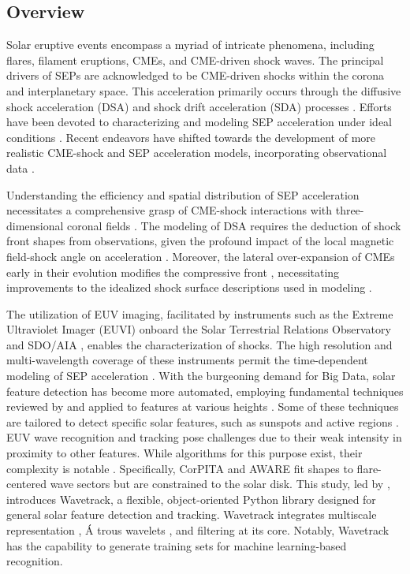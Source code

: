 \subsection{Overview}
Solar eruptive events encompass a myriad of intricate phenomena, including flares, filament eruptions, CMEs, and CME-driven shock waves. The principal drivers of SEPs are acknowledged to be CME-driven shocks within the corona and interplanetary space. This acceleration primarily occurs through the diffusive shock acceleration (DSA) and shock drift acceleration (SDA) processes \citep{reames_2021}. Efforts have been devoted to characterizing and modeling SEP acceleration under ideal conditions \citep{vainio_2008, sokolov_2009, kozarev_2013}. Recent endeavors have shifted towards the development of more realistic CME-shock and SEP acceleration models, incorporating observational data \citep{vourlidas_2012, kwon_2014, kozarev_2015, kozarev_2019}.

Understanding the efficiency and spatial distribution of SEP acceleration necessitates a comprehensive grasp of CME-shock interactions with three-dimensional coronal fields \cite{rouillard_2016}. The modeling of DSA requires the deduction of shock front shapes from observations, given the profound impact of the local magnetic field-shock angle on acceleration \cite{guo_2013}. Moreover, the lateral over-expansion of CMEs early in their evolution modifies the compressive front \cite{bein_2011, temmer_2016}, necessitating improvements to the idealized shock surface descriptions used in modeling \citep{vourlidas_2012, kwon_2014, rouillard_2016}.

The utilization of EUV imaging, facilitated by instruments such as the Extreme Ultraviolet Imager (EUVI) onboard the Solar Terrestrial Relations Observatory \citep[STEREO]{wuelser_2004} and SDO/AIA \citep{lemen_2012}, enables the characterization of shocks. The high resolution and multi-wavelength coverage of these instruments permit the time-dependent modeling of SEP acceleration \citep{kozarev_2016, kozarev_2017, kozarev_2019}. With the burgeoning demand for Big Data, solar feature detection has become more automated, employing fundamental techniques reviewed by \citet{aschwanden_2010} and applied to features at various heights \citep{perez_Suarez_2011}. Some of these techniques are tailored to detect specific solar features, such as sunspots and active regions \citep{curto_2008}.
EUV wave recognition and tracking pose challenges due to their weak intensity in proximity to other features. While algorithms for this purpose exist, their complexity is notable \citep{podladchikova_2005, verbeeck_2014, long_2014, ireland_2019}. Specifically, CorPITA \citep{long_2014} and AWARE \citep{ireland_2019} fit shapes to flare-centered wave sectors but are constrained to the solar disk.
This study, led by \citet{stepanyuk_2022}, introduces Wavetrack, a flexible, object-oriented Python library designed for general solar feature detection and tracking. Wavetrack integrates multiscale representation \citep{starck_2002}, \'A trous wavelets \citep{akansu_1991, holschneider_1989}, and filtering at its core. Notably, Wavetrack has the capability to generate training sets for machine learning-based recognition.

